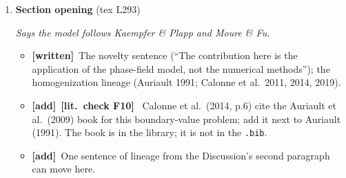 \documentclass[11pt]{article}
\newcommand{\Have}{\textcolor{have}{\textbf{[written]}}\ }
\newcommand{\Pg}[3]{\item \textbf{#1} {\small(#2)}\par\textit{#3}}
\newcommand{\tA}{\textcolor{have}{\textbf{[add]}}\ }
\newcommand{\Chk}[1]{\textcolor{chk}{\textbf{[lit.\ check #1]}}\ }
\begin{document}
\begin{enumerate}
\Pg{Section opening}{tex L293}{Says the model follows Kaempfer \& Plapp and Moure \& Fu.}
  \begin{itemize}
  \item \Have The novelty sentence (``The contribution here is the
    application of the phase-field model, not the numerical methods''); the
    homogenization lineage (Auriault 1991; Calonne et al.\ 2011, 2014, 2019).
  \item \tA \Chk{F10} Calonne et al.\ (2014, p.6) cite the Auriault et al.\
    (2009) book for this boundary-value problem; add it next to Auriault
    (1991). The book is in the library; it is not in the \texttt{.bib}.
  \item \tA One sentence of lineage from the Discussion's second paragraph
    can move here.
  \end{itemize}

\end{enumerate}
\end{document}
